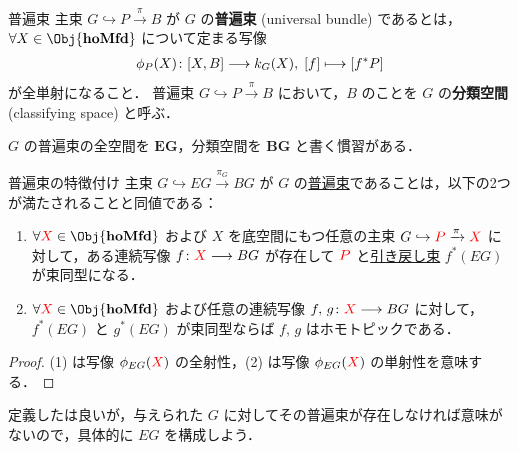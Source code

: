 \documentclass[TQFT_main]{subfiles}
\begin{document}
\begin{mydef}[label=def:universal-bundle]{普遍束}
    主束 $G \hookrightarrow P \xrightarrow{\pi} B$ が $G$ の\textbf{普遍束} (universal bundle) であるとは，$\forall X \in \Obj{\bm{\mathrm{hoMfd}}}$ について定まる写像
    \begin{align}
        \phi_P (X) \colon \comm{X}{B} \lto k_G(X),\; [f] \lmto [f^* P]
    \end{align}
    が全単射になること．
    \tcblower
    普遍束 $G \hookrightarrow P \xrightarrow{\pi} B$ において，$B$ のことを $G$ の\textbf{分類空間} (classifying space) と呼ぶ．
\end{mydef}
$G$ の普遍束の全空間を $\bm{EG}$，分類空間を $\bm{BG}$ と書く慣習がある．

\begin{myprop}[label=prop:universal-basic]{普遍束の特徴付け}
    主束 $G \hookrightarrow EG \xrightarrow{\pi_G} BG$ が $G$ の\hyperref[def:universal-bundle]{普遍束}であることは，以下の2つが満たされることと同値である：
    \begin{enumerate}
        \item $\forall \textcolor{red}{X} \in \Obj{\bm{\mathrm{hoMfd}}}$ および $X$ を底空間にもつ任意の主束 $G \hookrightarrow \textcolor{red}{P} \xrightarrow{\pi} \textcolor{red}{X}$ に対して，ある連続写像 $f \colon \textcolor{red}{X} \longrightarrow BG$ が存在して
        $\textcolor{red}{P}$ と\hyperref[def:pullback-bundle]{引き戻し束} $f^*(EG)$ が束同型になる．
        \item $\forall \textcolor{red}{X} \in \Obj{\bm{\mathrm{hoMfd}}}$ および任意の連続写像 $f,\, g \colon \textcolor{red}{X} \longrightarrow BG$ に対して，
        $f^*(EG)$ と $g^*(EG)$ が束同型ならば $f,\, g$ はホモトピックである．
    \end{enumerate}
\end{myprop}

\begin{proof}
    (1) は写像 $\phi_{EG}(\textcolor{red}{X})$ の全射性，(2) は写像 $\phi_{EG}(\textcolor{red}{X})$ の単射性を意味する．
\end{proof}

定義したは良いが，与えられた $G$ に対してその普遍束が存在しなければ意味がないので，具体的に $EG$ を構成しよう．
\end{document}
